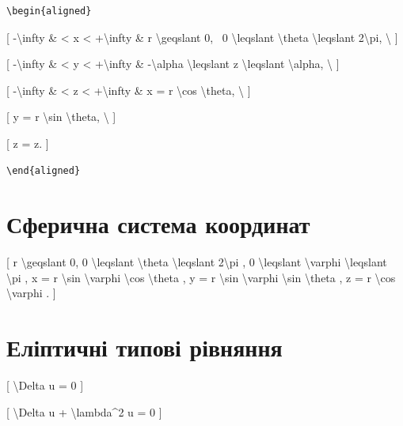 \documentclass[
]{article}
\begin{document}
{{{{\begin{verbatim}
\begin{aligned}
\end{verbatim}

{[} -\textbackslash infty \& \textless{} x \textless{}
+\textbackslash infty \& r \textbackslash geqslant 0, ~0
\textbackslash leqslant \textbackslash theta \textbackslash leqslant
2\textbackslash pi, \textbackslash{} {]}

{[} -\textbackslash infty \& \textless{} y \textless{}
+\textbackslash infty \& -\textbackslash alpha \textbackslash leqslant z
\textbackslash leqslant \textbackslash alpha, \textbackslash{} {]}

{[} -\textbackslash infty \& \textless{} z \textless{}
+\textbackslash infty \& x = r \textbackslash cos \textbackslash theta,
\textbackslash{} {]}

{[} y = r \textbackslash sin \textbackslash theta, \textbackslash{} {]}

{[} z = z. {]}

\begin{verbatim}
\end{aligned}
\end{verbatim}

\section{Сферична система
координат}\label{ux441ux444ux435ux440ux438ux447ux43dux430-ux441ux438ux441ux442ux435ux43cux430-ux43aux43eux43eux440ux434ux438ux43dux430ux442-1}

{[} r \textbackslash geqslant 0, 0 \textbackslash leqslant
\textbackslash theta \textbackslash leqslant 2\textbackslash pi , 0
\textbackslash leqslant \textbackslash varphi \textbackslash leqslant
\textbackslash pi , x = r \textbackslash sin \textbackslash varphi
\textbackslash cos \textbackslash theta , y = r \textbackslash sin
\textbackslash varphi \textbackslash sin \textbackslash theta , z = r
\textbackslash cos \textbackslash varphi . {]}

\section{Еліптичні типові
рівняння}\label{ux435ux43bux456ux43fux442ux438ux447ux43dux456-ux442ux438ux43fux43eux432ux456-ux440ux456ux432ux43dux44fux43dux43dux44f}

{[} \textbackslash Delta u = 0 {]}

{[} \textbackslash Delta u + \textbackslash lambda\^{}2 u = 0 {]}

}}}}
\end{document}
